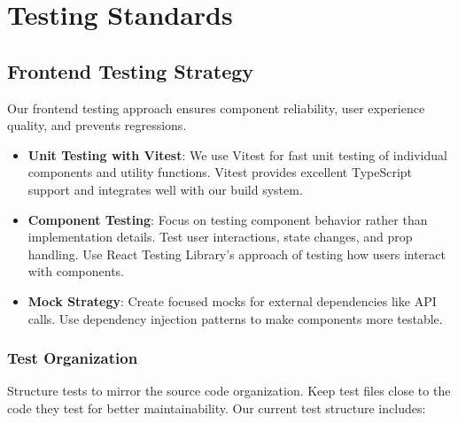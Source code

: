 \documentclass[12pt]{article}
\begin{document}
\section{Testing Standards}

\subsection{Frontend Testing Strategy}
Our frontend testing approach ensures component reliability, user experience quality, and prevents regressions.

\begin{itemize}
    \item \textbf{Unit Testing with Vitest}: We use Vitest for fast unit testing of individual components and utility functions. Vitest provides excellent TypeScript support and integrates well with our build system.
    
    \item \textbf{Component Testing}: Focus on testing component behavior rather than implementation details. Test user interactions, state changes, and prop handling. Use React Testing Library's approach of testing how users interact with components.
    
    \item \textbf{Mock Strategy}: Create focused mocks for external dependencies like API calls. Use dependency injection patterns to make components more testable.
\end{itemize}

\subsubsection{Test Organization}
Structure tests to mirror the source code organization. Keep test files close to the code they test for better maintainability. Our current test structure includes:
\end{document}
